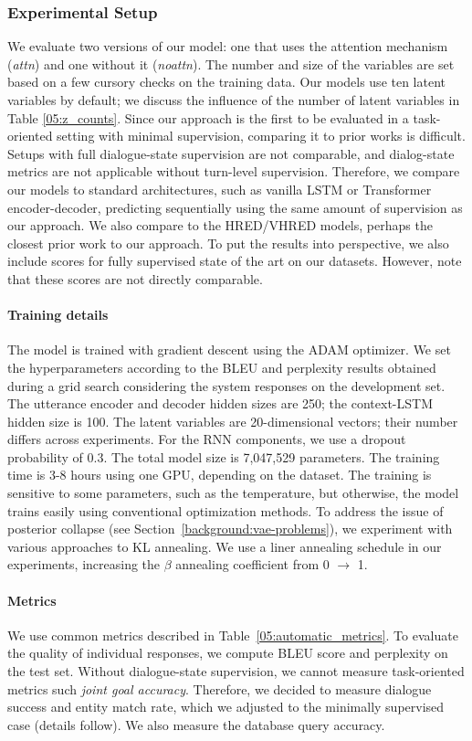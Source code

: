 \subsubsection{Experimental Setup}
\label{05:sec:expe_setup}
We evaluate two versions of our model: one that uses the attention mechanism (\emph{attn}) and one without it (\emph{noattn}). The number and size of the variables are set based on a few cursory checks on the training data. Our models use ten latent variables by default; we discuss the influence of the number of latent variables in Table \ref{05:z_counts}.
Since our approach is the first to be evaluated in a task-oriented setting with minimal supervision, comparing it to prior works is difficult. Setups with full dialogue-state supervision are not comparable, and dialog-state metrics are not applicable without turn-level supervision. Therefore, we compare our models to standard architectures, such as vanilla LSTM or Transformer encoder-decoder, predicting sequentially using the same amount of supervision as our approach. We also compare to the HRED/VHRED models, perhaps the closest prior work to our approach. To put the results into perspective, we also include scores for fully supervised state of the art on our datasets.
However, note that these scores are not directly comparable.

\paragraph{Training details}
The model is trained with gradient descent using the ADAM optimizer.
We set the hyperparameters according to the BLEU and perplexity results obtained during a grid search considering the system responses on the development set.
The utterance encoder and decoder hidden sizes are 250; the context-LSTM hidden size is 100.
The latent variables are 20-dimensional vectors; their number differs across experiments.
For the RNN components, we use a dropout probability of $0.3$.
The total model size is 7,047,529 parameters.
The training time is 3-8 hours using one GPU, depending on the dataset.
The training is sensitive to some parameters, such as the  temperature, but otherwise, the model trains easily using conventional optimization methods.
To address the issue of posterior collapse (see Section~\ref{background:vae-problems}), we experiment with various approaches to KL annealing.
We use a liner annealing schedule in our experiments, increasing the $\beta$ annealing coefficient from 0 $\rightarrow$ 1.
\paragraph{Metrics}
We use common metrics described in Table~\ref{05:automatic_metrics}.
To evaluate the quality of individual responses, we compute BLEU score and perplexity on the test set.
Without dialogue-state supervision, we cannot measure task-oriented metrics such \emph{joint goal accuracy}.
Therefore, we decided to measure dialogue success and entity match rate, which we adjusted to the minimally supervised case (details follow).
We also measure the database query accuracy.


